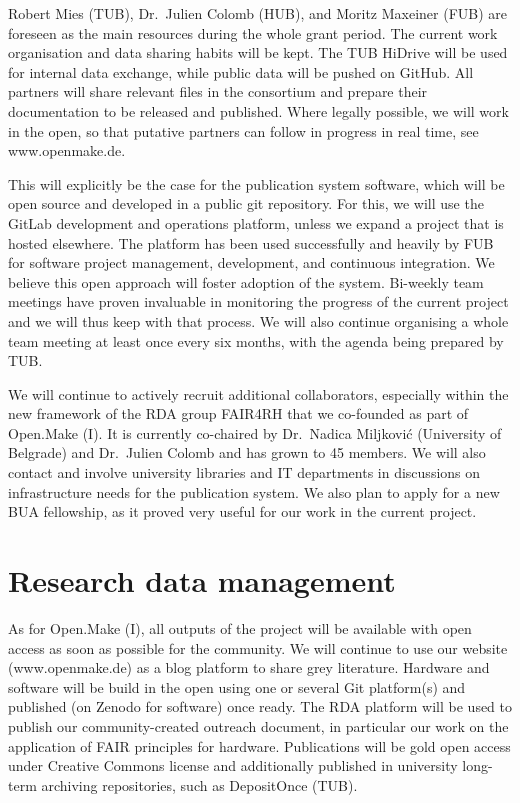 \documentclass[
  12pt,
  a4paper,
]{article}
\begin{document}
Robert Mies (TUB), Dr.~Julien Colomb (HUB), and Moritz Maxeiner (FUB)
are foreseen as the main resources during the whole grant period. The
current work organisation and data sharing habits will be kept. The TUB
HiDrive will be used for internal data exchange, while public data will
be pushed on GitHub. All partners will share relevant files in the
consortium and prepare their documentation to be released and published.
Where legally possible, we will work in the open, so that putative
partners can follow in progress in real time, see www.openmake.de.

This will explicitly be the case for the publication system software,
which will be open source and developed in a public git repository. For
this, we will use the GitLab development and operations platform, unless
we expand a project that is hosted elsewhere. The platform has been used
successfully and heavily by FUB for software project management,
development, and continuous integration. We believe this open approach
will foster adoption of the system. Bi-weekly team meetings have proven
invaluable in monitoring the progress of the current project and we will
thus keep with that process. We will also continue organising a whole
team meeting at least once every six months, with the agenda being
prepared by TUB.

We will continue to actively recruit additional collaborators,
especially within the new framework of the RDA group FAIR4RH that we
co-founded as part of Open.Make (I). It is currently co-chaired by
Dr.~Nadica Miljković (University of Belgrade) and Dr.~Julien Colomb and
has grown to 45 members. We will also contact and involve university
libraries and IT departments in discussions on infrastructure needs for
the publication system. We also plan to apply for a new BUA fellowship,
as it proved very useful for our work in the current project.

\hypertarget{research-data-management}{%
\section{Research data management}\label{research-data-management}}

As for Open.Make (I), all outputs of the project will be available with
open access as soon as possible for the community. We will continue to
use our website (www.openmake.de) as a blog platform to share grey
literature. Hardware and software will be build in the open using one or
several Git platform(s) and published (on Zenodo for software) once
ready. The RDA platform will be used to publish our community-created
outreach document, in particular our work on the application of FAIR
principles for hardware. Publications will be gold open access under
Creative Commons license and additionally published in university
long-term archiving repositories, such as DepositOnce (TUB).
\end{document}
